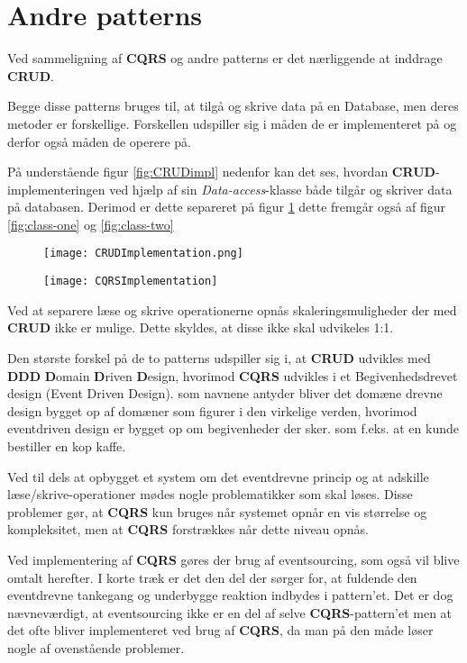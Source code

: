 \section{Andre patterns}
Ved sammeligning af \textbf{CQRS} og andre patterns er det nærliggende at inddrage \textbf{CRUD}.

Begge disse patterns bruges til, at tilgå og skrive data på en Database, men deres metoder er forskellige. Forskellen udspiller sig i måden de er implementeret på og derfor også måden de operere på.\newline

På understående figur \ref{fig:CRUDimpl} nedenfor kan det ses, hvordan \textbf{CRUD}-implementeringen ved hjælp af sin \textit{Data-access}-klasse både tilgår og skriver data på databasen. Derimod er dette separeret på figur \ref{fig:CQRSimpl} dette fremgår også af figur \ref{fig:class-one} og \ref{fig:class-two}

\begin{figure}[H]
	\centering
	\begin{minipage}{.5\textwidth}
		\centering
		\texttt{[image: CRUDImplementation.png]}
		\label{fig:CRUDimpl}
	\end{minipage}%
	\begin{minipage}{.5\textwidth}
		\centering
		\texttt{[image: CQRSImplementation]}
		\label{fig:CQRSimpl}
	\end{minipage}
\end{figure}


Ved at separere læse og skrive operationerne opnås skaleringsmuligheder der med \textbf{CRUD} ikke er mulige. Dette skyldes, at disse ikke skal udvikeles 1:1.\newline

Den største forskel på de to patterns udspiller sig i, at \textbf{CRUD} udvikles med \textbf{DDD} \textbf{D}omain \textbf{D}riven \textbf{D}esign, hvorimod \textbf{CQRS} udvikles i et Begivenhedsdrevet design (Event Driven Design). som navnene antyder bliver det domæne drevne design bygget op af domæner som figurer i den virkelige verden, hvorimod eventdriven design er bygget op om begivenheder der sker. som f.eks. at en kunde bestiller en kop kaffe.

Ved til dels at opbygget et system om det eventdrevne princip og at adskille læse/skrive-operationer mødes nogle problematikker som skal løses. Disse problemer gør, at \textbf{CQRS} kun bruges når systemet opnår en vis størrelse og kompleksitet, men at \textbf{CQRS} forstrækkes når dette niveau opnås.\newline

Ved implementering af \textbf{CQRS} gøres der brug af eventsourcing, som også vil blive omtalt herefter. I korte træk er det den del der sørger for, at fuldende den eventdrevne tankegang og underbygge reaktion indbydes i pattern'et.
Det er dog nævneværdigt, at eventsourcing ikke er en del af selve \textbf{CQRS}-pattern'et men at det ofte bliver implementeret ved brug af \textbf{CQRS}, da man på den måde løser nogle af ovenstående problemer.

